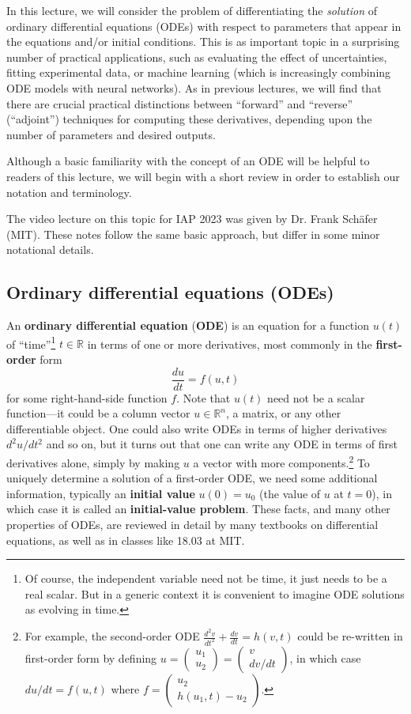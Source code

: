 In this lecture, we will consider the problem of differentiating the \emph{solution} of ordinary differential equations (ODEs) with respect to parameters that appear in the equations and/or initial conditions.  This is as important topic in a surprising number of practical applications, such as evaluating the effect of uncertainties, fitting experimental data, or machine learning (which is increasingly combining ODE models with neural networks).  As in previous lectures, we will find that there are crucial practical distinctions between ``forward'' and ``reverse'' (``adjoint'') techniques for computing these derivatives, depending upon the number of parameters and desired outputs.

Although a basic familiarity with the concept of an ODE will be helpful to readers of this lecture, we will begin with a short review in order to establish our notation and terminology.

The video lecture on this topic for IAP 2023 was given by Dr. Frank Sch\"afer (MIT).  These notes follow the same basic approach, but differ in some minor notational details.

\subsection{Ordinary differential equations (ODEs)}
An \textbf{ordinary differential equation} (\textbf{ODE}) is an equation
for a function $u(t)$ of ``time''\footnote{Of course, the independent variable need not be time, it just needs to be a real scalar.  But in a generic context it is convenient to imagine ODE solutions as evolving in time.} $t\in\mathbb{R}$ in terms of
one or more derivatives, most commonly in the \textbf{first-order}
form 
\[
\frac{du}{dt}=f(u,t)
\]
for some right-hand-side function $f$. Note that $u(t)$ need not
be a scalar function---it could be a column vector $u\in\mathbb{R}^{n}$,
a matrix, or any other differentiable object. One could also write
ODEs in terms of higher derivatives $d^{2}u/dt^{2}$ and so on, but
it turns out that one can write any ODE in terms of first derivatives
alone, simply by making $u$ a vector with more components.\footnote{For example, the second-order ODE $\frac{d^{2}v}{dt^{2}}+\frac{dv}{dt}=h(v,t)$
could be re-written in first-order form by defining $u=\left(\begin{array}{c}
u_{1}\\
u_{2}
\end{array}\right)=\left(\begin{array}{c}
v\\
dv/dt
\end{array}\right)$, in which case $du/dt=f(u,t)$ where $f=\left(\begin{array}{c}
u_{2}\\
h(u_{1},t)-u_{2}
\end{array}\right)$. } To uniquely determine a solution of a first-order ODE, we need some
additional information, typically an \textbf{initial value} $u(0)=u_{0}$
(the value of $u$ at $t=0$), in which case it is called an \textbf{initial-value
problem}. These facts, and many other properties of ODEs, are reviewed
in detail by many textbooks on differential equations, as well as
in classes like 18.03 at MIT.

